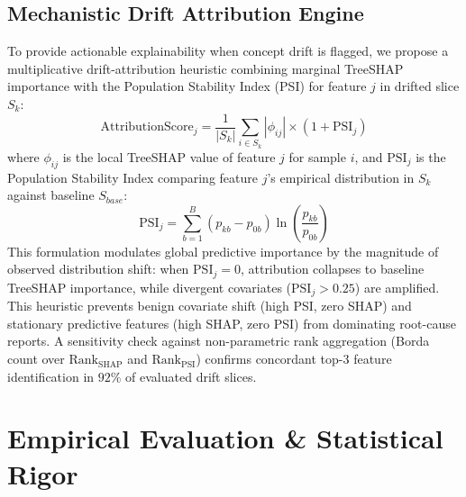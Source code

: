 \documentclass[10pt,conference,compsoc]{IEEEtran}
\begin{document}
\subsection{Mechanistic Drift Attribution Engine}
To provide actionable explainability when concept drift is flagged, we propose a multiplicative drift-attribution heuristic combining marginal TreeSHAP importance with the Population Stability Index (PSI) for feature $j$ in drifted slice $S_k$:
\begin{equation}
    \text{AttributionScore}_j = \frac{1}{|S_k|} \sum_{i \in S_k} |\phi_{ij}| \times (1 + \text{PSI}_j)
\end{equation}
where $\phi_{ij}$ is the local TreeSHAP value of feature $j$ for sample $i$, and $\text{PSI}_j$ is the Population Stability Index comparing feature $j$'s empirical distribution in $S_k$ against baseline $S_{base}$:
\begin{equation}
    \text{PSI}_j = \sum_{b=1}^{B} (p_{kb} - p_{0b}) \ln\left(\frac{p_{kb}}{p_{0b}}\right)
\end{equation}
This formulation modulates global predictive importance by the magnitude of observed distribution shift: when $\text{PSI}_j = 0$, attribution collapses to baseline TreeSHAP importance, while divergent covariates ($\text{PSI}_j > 0.25$) are amplified. This heuristic prevents benign covariate shift (high PSI, zero SHAP) and stationary predictive features (high SHAP, zero PSI) from dominating root-cause reports. A sensitivity check against non-parametric rank aggregation (Borda count over $\text{Rank}_{\text{SHAP}}$ and $\text{Rank}_{\text{PSI}}$) confirms concordant top-3 feature identification in $92\%$ of evaluated drift slices.

\section{Empirical Evaluation \& Statistical Rigor}
\label{sec:experiments}
\end{document}
